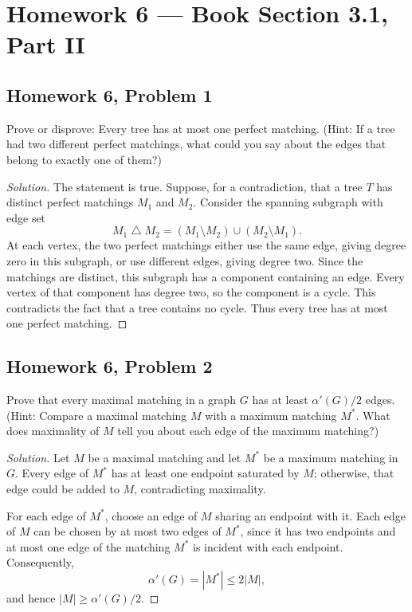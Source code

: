 \documentclass[12pt]{amsart}
\newenvironment{solution}{\begin{proof}[Solution]}{\end{proof}}
\begin{document}
    \clearpage
    \section*{Homework 6 --- Book Section 3.1, Part II}

    \subsection*{Homework 6, Problem 1} Prove or disprove: Every tree has at most one perfect matching.
    (Hint: If a tree had two different perfect matchings, what could you say about the
    edges that belong to exactly one of them?)

    \begin{solution}
        The statement is true. Suppose, for a contradiction, that a tree \(T\)
        has distinct perfect matchings \(M_1\) and \(M_2\). Consider the spanning
        subgraph with edge set
        \[
            M_1\mathbin{\triangle}M_2
            =(M_1\setminus M_2)\cup(M_2\setminus M_1).
        \]
        At each vertex, the two perfect matchings either use the same edge,
        giving degree zero in this subgraph, or use different edges, giving
        degree two. Since the matchings are distinct, this subgraph has a
        component containing an edge. Every vertex of that component has
        degree two, so the component is a cycle. This contradicts the fact
        that a tree contains no cycle. Thus every tree has at most one
        perfect matching.
    \end{solution}

    \subsection*{Homework 6, Problem 2} Prove that every maximal matching in a graph \(G\) has at least
    \(\alpha'(G)/2\) edges.
    (Hint: Compare a maximal matching $M$ with a maximum matching $M^*$.
    What does maximality of $M$ tell you about each edge of the maximum matching?)

    \begin{solution}
        Let \(M\) be a maximal matching and let \(M^*\) be a maximum
        matching in \(G\). Every edge of \(M^*\) has at least one endpoint
        saturated by \(M\); otherwise, that edge could be added to \(M\),
        contradicting maximality.

        For each edge of \(M^*\), choose an edge of \(M\) sharing an endpoint
        with it. Each edge of \(M\) can be chosen by at most two edges of
        \(M^*\), since it has two endpoints and at most one edge of the
        matching \(M^*\) is incident with each endpoint. Consequently,
        \[
            \alpha'(G)=|M^*|\leq 2|M|,
        \]
        and hence \(|M|\geq \alpha'(G)/2\).
    \end{solution}
\end{document}
